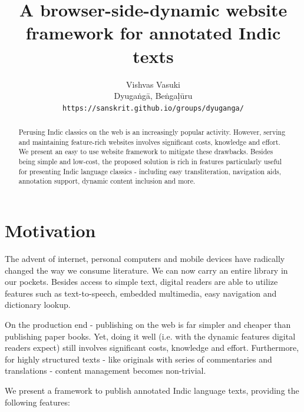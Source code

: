 \documentclass[11pt]{article}
\title{A browser-side-dynamic website framework for annotated Indic texts}
\author{
  Vishvas Vasuki \\
  Dyugaṅgā, Beṅgaḷūru \\
  {\tt https://sanskrit.github.io/groups/dyuganga/}
\\}
\date{}
\begin{document}
\maketitle
\begin{abstract}
Perusing Indic classics on the web is an increasingly popular activity. However, serving and maintaining feature-rich websites involves significant costs, knowledge and effort. We present an easy to use website framework to mitigate these drawbacks. Besides being simple and low-cost, the proposed solution is rich in features particularly useful for presenting Indic language classics - including easy transliteration, navigation aids, annotation support, dynamic content inclusion and more.
\end{abstract}

\section{Motivation}
The advent of internet, personal computers and mobile devices have radically changed the way we consume literature. We can now carry an entire library in our pockets. Besides access to simple text, digital readers are able to utilize features such as text-to-speech, embedded multimedia, easy navigation and dictionary lookup. 

On the production end - publishing on the web is far simpler and cheaper than publishing paper books. Yet, doing it well (i.e. with the dynamic features digital readers expect) still involves significant costs, knowledge and effort. Furthermore, for highly structured texts - like originals with series of commentaries and translations - content management becomes non-trivial.

We present a framework to publish annotated Indic language texts, providing the following features:
\end{document}
